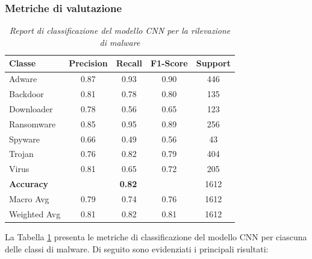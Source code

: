 \subsubsection{Metriche di valutazione}
\begin{table}[ht]
    \centering
    \begin{tabular}{@{}|lcccc|@{}}
    \toprule
    \textbf{Classe}      & \textbf{Precision} & \textbf{Recall} & \textbf{F1-Score} & \textbf{Support} \\ \midrule
    Adware          & 0.87               & 0.93            & 0.90              & 446              \\
    Backdoor        & 0.81               & 0.78            & 0.80              & 135              \\
    Downloader      & 0.78               & 0.56            & 0.65              & 123              \\
    Ransomware      & 0.85               & 0.95            & 0.89              & 256              \\
    Spyware         & 0.66               & 0.49            & 0.56              & 43               \\
    Trojan          & 0.76               & 0.82            & 0.79              & 404              \\
    Virus           & 0.81               & 0.65            & 0.72              & 205              \\ \midrule
    \textbf{Accuracy}      & \multicolumn{3}{c}{\textbf{0.82}}         & 1612             \\ \midrule
    Macro Avg       & 0.79               & 0.74            & 0.76              & 1612             \\
    Weighted Avg    & 0.81               & 0.82            & 0.81              & 1612             \\ \bottomrule
    \end{tabular}
    \vspace{.2cm}
    \caption{\emph{Report di classificazione del modello CNN per la rilevazione di malware}}
    \label{tab:report_3_esperimento}
\end{table}
La Tabella \ref{tab:report_3_esperimento} presenta le metriche di classificazione del modello CNN per ciascuna delle classi di malware. Di seguito sono evidenziati i principali risultati:
